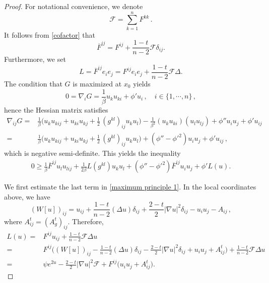 \documentclass{article}
\theoremstyle{plain}
\theoremstyle{definition}
\theoremstyle{definition}
\numberwithin{equation}{section}
\begin{document}
\begin{sloppypar}
\begin{proof}
For notational convenience, we denote
\[
\mathcal{F}=\sum_{k=1}^{n}F^{kk}\,.
\]
It follows from \eqref{cofactor} that
\begin{equation}\label{relation}
\overline{F}^{ij}=F^{ij}+\frac{1-t}{n-2}\mathcal{F}\delta_{ij}.
\end{equation}
Furthermore, we set
\[
L=\overline{F}^{ij}e_{i}e_{j}=F^{ij}e_{i}e_{j}+\frac{1-t}{n-2}\mathcal{F}\Delta.
\]
The condition that $G$ is maximized at $x_0$ yields
\begin{equation}\label{vanishes1}
0=\nabla_{i}G=\frac{1}{\beta}u_{k}u_{ki}+ \phi'u_{i}\,, \quad i\in \{1,\cdots,n\}\,,
\end{equation}
hence the Hessian matrix satisfies
\begin{equation*}
\begin{split}
\nabla_{ij}G=& \frac{1}{\beta}\big(u_{k}u_{kij}+u_{ki}u_{kj}+\frac{1}{2}\,(g^{kl})_{ij}u_{k}u_{l}\big)-\frac{1}{\beta^2}(u_{k}u_{ki})(u_{l}u_{lj})+\phi''u_{i}u_{j}+\phi'u_{ij} \\
=& \frac{1}{\beta}\big(u_{k}u_{kij}+u_{ki}u_{kj}+\frac{1}{2}\,(g^{kl})_{ij}u_{k}u_{l}\big)+(\phi''-\phi'^2)u_{i}u_{j}+\phi'u_{ij}\,,
\end{split}
\end{equation*}
which is negative semi-definite. This yields the inequality
\begin{equation}\label{maximum principle 1}
\begin{split}
0\geq \frac{1}{\beta}\overline{F}^{ij}u_{l}u_{lij}+\frac{1}{2\beta}L(g^{kl})u_{k}u_{l}+(\phi''-\phi'^2)\overline{F}^{ij}u_{i}u_{j}+\phi'L(u).
\end{split}
\end{equation}

We first estimate the last term in \eqref{maximum principle 1}. In the local coordinates above, we have
\[
(W[u])_{ij}=u_{ij}+\frac{1-t}{n-2}(\Delta u)\delta_{ij}+\frac{2-t}{2}|\nabla u|^2\delta_{ij}-u_{i}u_{j}-A_{ij}\,,
\]
where $A^{t}_{ij}=(A^{t}_{g})_{ij}$. Therefore, 
\begin{equation}\label{Lu}
\begin{split}
L(u)=&F^{ij}u_{ij}+\frac{1-t}{n-2}\mathcal{F}\Delta u\\
=&F^{ij}\big((W[u])_{ij}-\frac{1-t}{n-2}(\Delta u)\delta_{ij}-\frac{2-t}{2}|\nabla u|^2\delta_{ij}+u_{i}u_{j}+A^{t}_{ij} \big)+\frac{1-t}{n-2}\mathcal{F}\Delta u\\
=&\psi e^{2u}-\frac{2-t}{2}|\nabla u|^2\mathcal{F}+F^{ij}\big(u_{i}u_{j}+A^{t}_{ij} \big).
\end{split}
\end{equation}


\end{proof}
\end{sloppypar}
\end{document}
